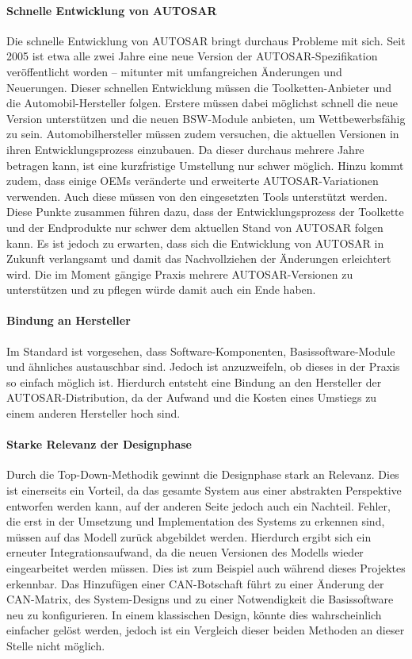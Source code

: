 \documentclass[
  a4paper,					    %
  twoside,
  DIV=calc,     				%
  bibliography=totoc,
  cleardoublepage=empty,
  ngerman,     					%
  final       					%
]{scrbook}
\begin{document}
\paragraph{Schnelle Entwicklung von AUTOSAR}
Die schnelle Entwicklung von AUTOSAR bringt durchaus Probleme mit sich. Seit 2005 ist etwa alle zwei Jahre eine neue Version der AUTOSAR-Spezifikation veröffentlicht worden -- mitunter mit umfangreichen Änderungen und Neuerungen. Dieser schnellen Entwicklung müssen die Toolketten-Anbieter und die Automobil-Hersteller folgen. Erstere müssen dabei möglichst schnell die neue Version unterstützen und die neuen BSW-Module anbieten, um Wettbewerbsfähig zu sein. Automobilhersteller müssen zudem versuchen, die aktuellen Versionen in ihren Entwicklungsprozess einzubauen. Da dieser durchaus mehrere Jahre betragen kann, ist eine kurzfristige Umstellung nur schwer möglich. Hinzu kommt zudem, dass einige OEMs veränderte und erweiterte AUTOSAR-Variationen verwenden. Auch diese müssen von den eingesetzten Tools unterstützt werden. Diese Punkte zusammen führen dazu, dass der Entwicklungsprozess der Toolkette und der Endprodukte nur schwer dem aktuellen Stand von AUTOSAR folgen kann. Es ist jedoch zu erwarten, dass sich die Entwicklung von AUTOSAR in Zukunft verlangsamt und damit das Nachvollziehen der Änderungen erleichtert wird. Die im Moment gängige Praxis mehrere AUTOSAR-Versionen zu unterstützen und zu pflegen würde damit auch ein Ende haben.\cite{as_kritik}\cite[Seite 179]{SE_Autosar}

\paragraph{Bindung an Hersteller}
Im Standard ist vorgesehen, dass Soft\-ware-Kom\-po\-nen\-ten, Basissoftware-Module und ähnliches austauschbar sind. Jedoch ist anzuzweifeln, ob dieses in der Praxis so einfach möglich ist. Hierdurch entsteht eine Bindung an den Hersteller der AUTOSAR-Distribution, da der Aufwand und die Kosten eines Umstiegs zu einem anderen Hersteller hoch sind.\cite{as_kritik}

\paragraph{Starke Relevanz der Designphase}
Durch die Top-Down-Methodik gewinnt die Designphase stark an Relevanz. Dies ist einerseits ein Vorteil, da das gesamte System aus einer abstrakten Perspektive entworfen werden kann, auf der anderen Seite jedoch auch ein Nachteil. Fehler, die erst in der Umsetzung und Implementation des Systems zu erkennen sind, müssen auf das Modell zurück abgebildet werden. Hierdurch ergibt sich ein erneuter Integrationsaufwand, da die neuen Versionen des Modells wieder eingearbeitet werden müssen. Dies ist zum Beispiel auch während dieses Projektes erkennbar. Das Hinzufügen einer CAN-Botschaft führt zu einer Änderung der CAN-Matrix, des System-Designs und zu einer Notwendigkeit die Basissoftware neu zu konfigurieren. In einem klassischen Design, könnte dies wahrscheinlich einfacher gelöst werden, jedoch ist ein Vergleich dieser beiden Methoden an dieser Stelle nicht möglich.
\end{document}
